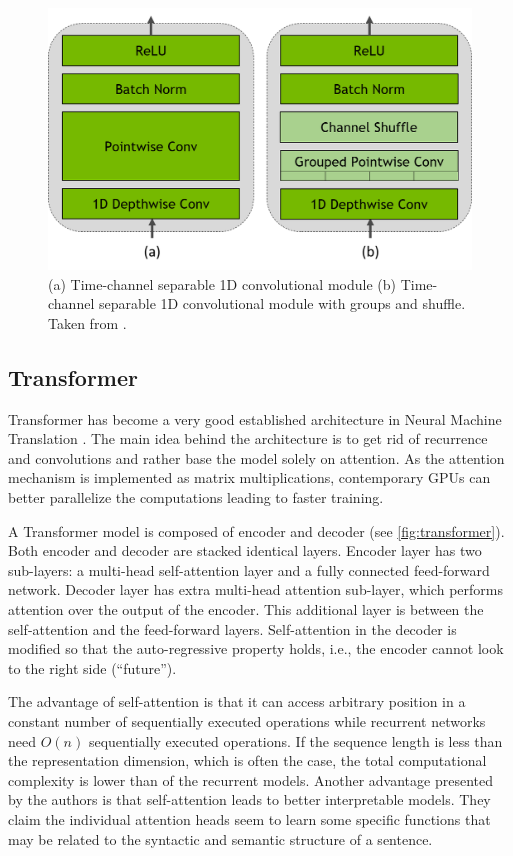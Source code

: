 \begin{figure}[t]
	\centering
	\includegraphics[width=0.8\linewidth]{img/QuartzNet_Grouped_v2.png}
	\caption{(a) Time-channel separable 1D convolutional module (b) Time-channel separable 1D convolutional module with groups and shuffle. Taken from .}
	\label{fig:quartz_arch_groups}
\end{figure}


\subsection{Transformer}
Transformer  has become a very good established architecture in Neural Machine Translation . The main idea behind the architecture is to get rid of recurrence and convolutions and rather base the model solely on attention. As the attention mechanism is implemented as matrix multiplications, contemporary GPUs can better parallelize the computations leading to faster training.

A Transformer model is composed of encoder and decoder (see \cref{fig:transformer}). Both encoder and decoder are stacked identical layers. Encoder layer has two sub-layers: a multi-head self-attention layer and a fully connected feed-forward network. Decoder layer has extra multi-head attention sub-layer, which performs attention over the output of the encoder. This additional layer is between the self-attention and the feed-forward layers. Self-attention in the decoder is modified so that the auto-regressive property holds, i.e., the encoder cannot look to the right side (``future'').

The advantage of self-attention is that it can access arbitrary position in a constant number of sequentially executed operations while recurrent networks need $O(n)$ sequentially executed operations. If the sequence length is less than the representation dimension, which is often the case, the total computational complexity is lower than of the recurrent models. Another advantage presented by the authors is that self-attention leads to better interpretable models. They claim the individual attention heads seem to learn some specific functions that may be related to the syntactic and semantic structure of a sentence.

